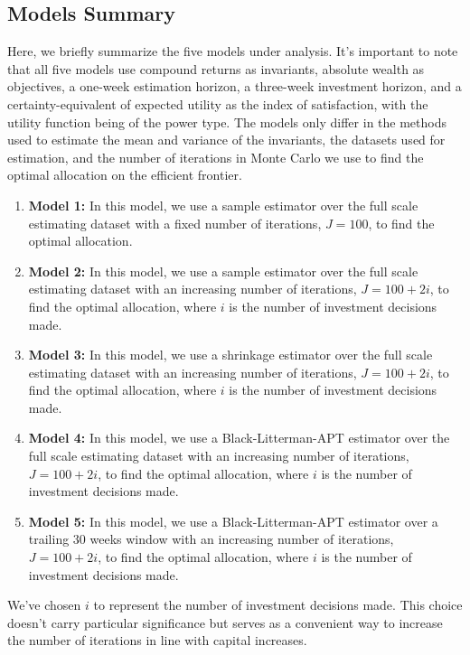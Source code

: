 \documentclass[13pt]{article}
\theoremstyle{definition}
\theoremstyle{remark}
\newenvironment{remark}
  {\pushQED{\qed}\renewcommand{\qedsymbol}{$\triangle$}\remarkx}
  {\popQED\endremarkx}
\begin{document}
\subsection{Models Summary}
Here, we briefly summarize the five models under analysis. It's important to note that all five models use compound returns as invariants, absolute wealth as objectives, a one-week estimation horizon, a three-week investment horizon, and a certainty-equivalent of expected utility as the index of satisfaction, with the utility function being of the power type. The models only differ in the methods used to estimate the mean and variance of the invariants, the datasets used for estimation, and the number of iterations in Monte Carlo we use to find the optimal allocation on the efficient frontier.
\begin{enumerate}
    \item \textbf{Model 1:} In this model, we use a sample estimator over the full scale estimating dataset with a fixed number of iterations, $J=100$, to find the optimal allocation.
    \item \textbf{Model 2:} In this model, we use a sample estimator over the full scale estimating dataset with an increasing number of iterations, $J=100+2i$, to find the optimal allocation, where $i$ is the number of investment decisions made.
    \item \textbf{Model 3:} In this model, we use a shrinkage estimator over the full scale estimating dataset with an increasing number of iterations, $J=100+2i$, to find the optimal allocation, where $i$ is the number of investment decisions made.
    \item \textbf{Model 4:} In this model, we use a Black-Litterman-APT estimator over the full scale estimating dataset with an increasing number of iterations, $J=100+2i$, to find the optimal allocation, where $i$ is the number of investment decisions made.
    \item \textbf{Model 5:} In this model, we use a Black-Litterman-APT estimator over a trailing 30 weeks window with an increasing number of iterations, $J=100+2i$, to find the optimal allocation, where $i$ is the number of investment decisions made.
\end{enumerate}
\begin{remark}
    We've chosen $i$ to represent the number of investment decisions made. This choice doesn't carry particular significance but serves as a convenient way to increase the number of iterations in line with capital increases.
\end{remark}
\end{document}
